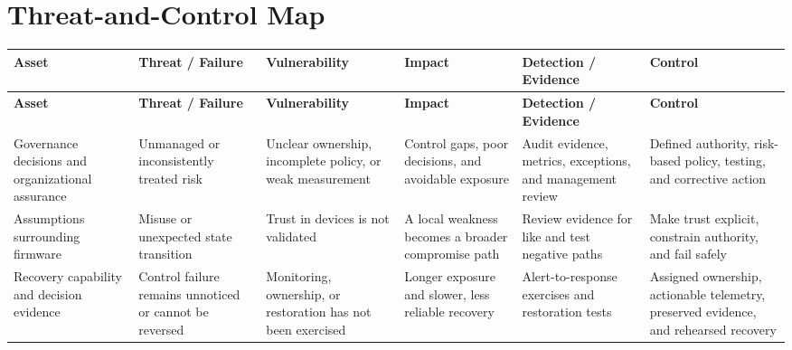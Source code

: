 \documentclass[11pt]{article}
\begin{document}
\section*{Threat-and-Control Map}
\begingroup\scriptsize\setlength{\tabcolsep}{2pt}
\begin{longtable}{>{\RaggedRight\arraybackslash}p{}>{\RaggedRight\arraybackslash}p{}>{\RaggedRight\arraybackslash}p{}>{\RaggedRight\arraybackslash}p{}>{\RaggedRight\arraybackslash}p{}>{\RaggedRight\arraybackslash}p{}}
\toprule\rowcolor{Navy}\color{white}\textbf{Asset} & \color{white}\textbf{Threat / Failure} & \color{white}\textbf{Vulnerability} & \color{white}\textbf{Impact} & \color{white}\textbf{Detection / Evidence} & \color{white}\textbf{Control}\\\midrule
\endfirsthead
\toprule\rowcolor{Navy}\color{white}\textbf{Asset} & \color{white}\textbf{Threat / Failure} & \color{white}\textbf{Vulnerability} & \color{white}\textbf{Impact} & \color{white}\textbf{Detection / Evidence} & \color{white}\textbf{Control}\\\midrule
\endhead
Governance decisions and organizational assurance & Unmanaged or inconsistently treated risk & Unclear ownership, incomplete policy, or weak measurement & Control gaps, poor decisions, and avoidable exposure & Audit evidence, metrics, exceptions, and management review & Defined authority, risk-based policy, testing, and corrective action\\\midrule
Assumptions surrounding firmware & Misuse or unexpected state transition & Trust in devices is not validated & A local weakness becomes a broader compromise path & Review evidence for like and test negative paths & Make trust explicit, constrain authority, and fail safely\\\midrule
Recovery capability and decision evidence & Control failure remains unnoticed or cannot be reversed & Monitoring, ownership, or restoration has not been exercised & Longer exposure and slower, less reliable recovery & Alert-to-response exercises and restoration tests & Assigned ownership, actionable telemetry, preserved evidence, and rehearsed recovery\\\midrule
\bottomrule
\end{longtable}
\endgroup
\end{document}
